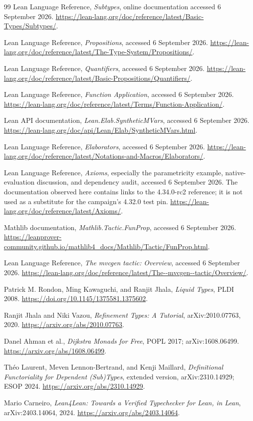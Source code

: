\documentclass[11pt,a4paper]{article}
\newcommand{\code}[1]{\texttt{\detokenize{#1}}}
\theoremstyle{definition}
\theoremstyle{remark}
\begin{document}
\begin{thebibliography}{99}
Lean Language Reference, \emph{Subtypes}, online documentation accessed
6 September 2026.
\url{https://lean-lang.org/doc/reference/latest/Basic-Types/Subtypes/}.

Lean Language Reference, \emph{Propositions}, accessed 6 September 2026.
\url{https://lean-lang.org/doc/reference/latest/The-Type-System/Propositions/}.

Lean Language Reference, \emph{Quantifiers}, accessed 6 September 2026.
\url{https://lean-lang.org/doc/reference/latest/Basic-Propositions/Quantifiers/}.

Lean Language Reference, \emph{Function Application}, accessed 6 September 2026.
\url{https://lean-lang.org/doc/reference/latest/Terms/Function-Application/}.

Lean API documentation, \emph{Lean.Elab.SyntheticMVars}, accessed
6 September 2026.
\url{https://lean-lang.org/doc/api/Lean/Elab/SyntheticMVars.html}.

Lean Language Reference, \emph{Elaborators}, accessed 6 September 2026.
\url{https://lean-lang.org/doc/reference/latest/Notations-and-Macros/Elaborators/}.

Lean Language Reference, \emph{Axioms}, especially the parametricity example,
native-evaluation discussion, and dependency audit, accessed 6 September 2026.
The \code{latest} documentation observed here contains links to the
4.34.0-rc2 reference; it is not used as a substitute for the campaign's
4.32.0 test pin.
\url{https://lean-lang.org/doc/reference/latest/Axioms/}.

Mathlib documentation, \emph{Mathlib.Tactic.FunProp}, accessed 6 September 2026.
\url{https://leanprover-community.github.io/mathlib4_docs/Mathlib/Tactic/FunProp.html}.

Lean Language Reference, \emph{The mvcgen tactic: Overview}, accessed
6 September 2026.
\url{https://lean-lang.org/doc/reference/latest/The--mvcgen--tactic/Overview/}.

Patrick M. Rondon, Ming Kawaguchi, and Ranjit Jhala,
\emph{Liquid Types}, PLDI 2008.
\url{https://doi.org/10.1145/1375581.1375602}.

Ranjit Jhala and Niki Vazou, \emph{Refinement Types: A Tutorial},
arXiv:2010.07763, 2020.
\url{https://arxiv.org/abs/2010.07763}.

Danel Ahman et al., \emph{Dijkstra Monads for Free}, POPL 2017;
arXiv:1608.06499.
\url{https://arxiv.org/abs/1608.06499}.

Th\'eo Laurent, Meven Lennon-Bertrand, and Kenji Maillard,
\emph{Definitional Functoriality for Dependent (Sub)Types}, extended version,
arXiv:2310.14929; ESOP 2024.
\url{https://arxiv.org/abs/2310.14929}.

Mario Carneiro, \emph{Lean4Lean: Towards a Verified Typechecker for Lean,
in Lean}, arXiv:2403.14064, 2024.
\url{https://arxiv.org/abs/2403.14064}.
\end{thebibliography}
\end{document}
